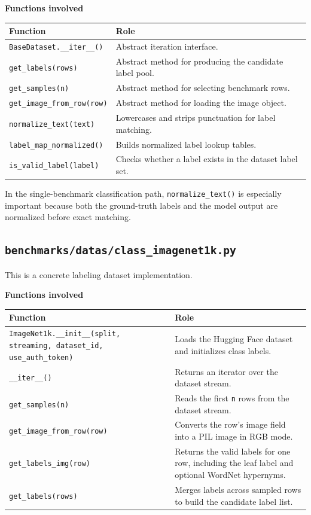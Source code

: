 \documentclass[11pt]{article}
\begin{document}
\textbf{Functions involved}
\begin{longtable}{>{\ttfamily}p{}p{}}
\textnormal{Function} & \textnormal{Role} \\
\hline
\texttt{BaseDataset.\_\_iter\_\_()} & Abstract iteration interface. \\
\texttt{get\_labels(rows)} & Abstract method for producing the candidate label pool. \\
\texttt{get\_samples(n)} & Abstract method for selecting benchmark rows. \\
\texttt{get\_image\_from\_row(row)} & Abstract method for loading the image object. \\
\texttt{normalize\_text(text)} & Lowercases and strips punctuation for label matching. \\
\texttt{label\_map\_normalized()} & Builds normalized label lookup tables. \\
\texttt{is\_valid\_label(label)} & Checks whether a label exists in the dataset label set. \\
\end{longtable}

In the single-benchmark classification path, \texttt{normalize\_text()} is especially important because both the ground-truth labels and the model output are normalized before exact matching.

\subsection*{\texttt{benchmarks/datas/class\_imagenet1k.py}}
This is a concrete labeling dataset implementation.

\textbf{Functions involved}
\begin{longtable}{>{\ttfamily}p{}p{}}
\textnormal{Function} & \textnormal{Role} \\
\hline
\texttt{ImageNet1k.\_\_init\_\_(split, streaming, dataset\_id, use\_auth\_token)} & Loads the Hugging Face dataset and initializes class labels. \\
\texttt{\_\_iter\_\_()} & Returns an iterator over the dataset stream. \\
\texttt{get\_samples(n)} & Reads the first \texttt{n} rows from the dataset stream. \\
\texttt{get\_image\_from\_row(row)} & Converts the row's image field into a PIL image in RGB mode. \\
\texttt{get\_labels\_img(row)} & Returns the valid labels for one row, including the leaf label and optional WordNet hypernyms. \\
\texttt{get\_labels(rows)} & Merges labels across sampled rows to build the candidate label list. \\
\end{longtable}
\end{document}
